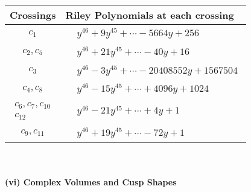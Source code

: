 \documentclass[1p]{elsarticle_modified}
\theoremstyle{definition}
\begin{document}
\begin{tabular}{m{50pt}|m{274pt}}
Crossings & \hspace{64pt}Riley Polynomials at each crossing \\
\hline $$\begin{aligned}c_{1}\end{aligned}$$&$\begin{aligned}
&y^{46}+9 y^{45}+\cdots-5664 y+256
\end{aligned}$\\
\hline $$\begin{aligned}c_{2},c_{5}\end{aligned}$$&$\begin{aligned}
&y^{46}+21 y^{45}+\cdots-40 y+16
\end{aligned}$\\
\hline $$\begin{aligned}c_{3}\end{aligned}$$&$\begin{aligned}
&y^{46}-3 y^{45}+\cdots-20408552 y+1567504
\end{aligned}$\\
\hline $$\begin{aligned}c_{4},c_{8}\end{aligned}$$&$\begin{aligned}
&y^{46}-15 y^{45}+\cdots+4096 y+1024
\end{aligned}$\\
\hline $$\begin{aligned}c_{6},c_{7},c_{10}\\c_{12}\end{aligned}$$&$\begin{aligned}
&y^{46}-21 y^{45}+\cdots+4 y+1
\end{aligned}$\\
\hline $$\begin{aligned}c_{9},c_{11}\end{aligned}$$&$\begin{aligned}
&y^{46}+19 y^{45}+\cdots-72 y+1
\end{aligned}$\\
\hline
\end{tabular}\\~\\
\newpage\flushleft \textbf{(vi) Complex Volumes and Cusp Shapes}
\end{document}
